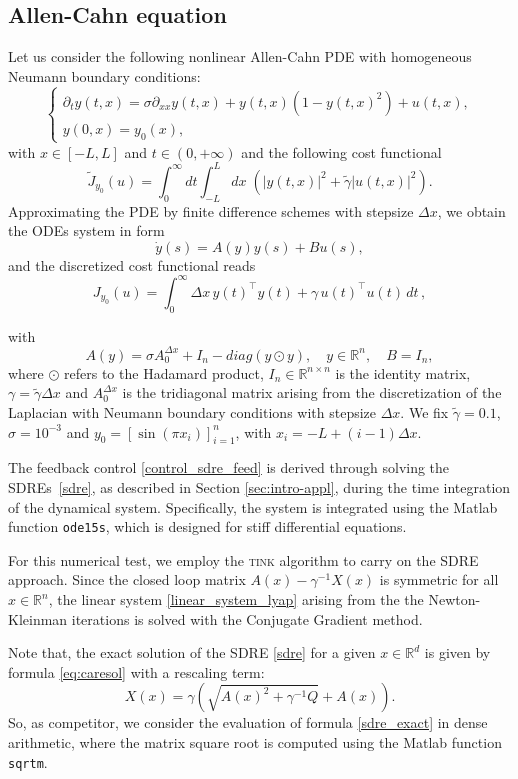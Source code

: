 \documentclass[a4paper,10pt]{article}
\begin{document}
\subsection{Allen-Cahn equation}\label{sec:allehn-cahn-1d}
Let us consider the following nonlinear Allen-Cahn PDE with homogeneous Neumann boundary conditions:
\begin{equation}
\left\{ \begin{array}{l}
\partial_t y(t,x) = \sigma \partial_{xx} y(t,x) +  y(t,x) (1-y(t,x)^2) + u(t,x),  \\
 y(0,x)=y_0(x),
\end{array} \right.
\label{AC}
\end{equation}
with $x \in [-L,L]$ and $t \in (0,+\infty)$ and the following cost functional
$$
\tilde{J}_{y_0}(u) = \int_0^{\infty} dt  \int_{-L}^L dx \;(|y(t,x)|^2 +  \tilde{\gamma} |u(t,x)|^2).
$$
Approximating the PDE by finite difference schemes with stepsize $\Delta x$, we obtain the ODEs system in form 
$$
\dot{y}(s)=A(y) y(s) + Bu(s),
$$
and the discretized cost functional reads
$$
J_{y_0}(u) = \int_0^{\infty}  \Delta x \, y(t)^\top y(t) +  \gamma  \, u(t)^\top u(t) \, dt \,,
$$

with
$$
A(y) = \sigma A^{\Delta x}_0 + I_n - diag(y \odot y),\quad y \in \mathbb{R}^n, \quad B = I_n ,
$$
where $\odot$ refers to the Hadamard product, $I_n \in \mathbb{R}^{n \times n}$ is the identity matrix, $\gamma = \tilde{\gamma} \Delta x$ and $A^{\Delta x}_0$ is the tridiagonal matrix arising from the discretization of the Laplacian with Neumann boundary conditions with stepsize $\Delta x$.
We fix $\tilde{\gamma} = 0.1$, $\sigma = 10^{-3}$ and $y_0 = [\sin(\pi x_i)]_{i=1}^n$, with $x_i =-L+ (i-1) \Delta x$. 

The feedback control \eqref{control_sdre_feed} is derived through solving the SDREs~\eqref{sdre}, as described in Section \ref{sec:intro-appl}, during the time integration of the dynamical system. Specifically, the system is integrated using the Matlab function \texttt{ode15s}, which is designed for stiff differential equations.

For this numerical test, we employ the \textsc{tink} algorithm to carry on the SDRE approach.
Since the closed loop matrix $A(x)-\gamma^{-1}X(x)$ is symmetric for all $x\in \mathbb{R}^n$, the linear system \eqref{linear_system_lyap} arising from the the Newton-Kleinman iterations is solved with the Conjugate Gradient method.

Note that, the exact solution of the SDRE \eqref{sdre} for a given $x \in \mathbb{R}^d$ is given by formula \eqref{eq:caresol} with a rescaling term: 
\begin{equation}
	X(x)= \gamma \left(\sqrt{A(x)^2+\gamma^{-1} Q}+A(x)\right).
	\label{sdre_exact}
\end{equation}
So, as competitor, we consider the evaluation of formula \eqref{sdre_exact} in dense arithmetic, where the matrix square root is computed using the Matlab function \texttt{sqrtm}.
\end{document}
